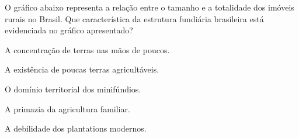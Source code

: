 %
%

\questao
O gráfico abaixo representa a relação entre o tamanho e a totalidade dos imóveis rurais no Brasil. Que característica da estrutura fundiária brasileira está evidenciada no gráfico apresentado?
\begin{alternativas}
\item A concentração de terras nas mãos de poucos.
\item A existência de poucas terras agricultáveis.
\item O domínio territorial dos minifúndios.
\item A primazia da agricultura familiar.
\item A debilidade dos plantations modernos.
\end{alternativas}

